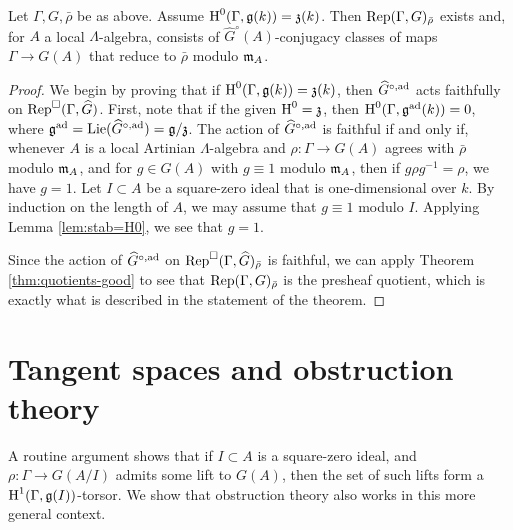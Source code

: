 \begin{theorem}
Let $\Gamma,G,\bar\rho$ be as above. Assume $\operatorname{H}^0(\Gamma,\mathfrak{g}(k))=\mathfrak{z}(k)$. Then 
$\operatorname{Rep}(\Gamma,G)_{\bar\rho}$ exists and, for $A$ a local $\Lambda$-algebra, 
consists of $\widehat G^\circ(A)$-conjugacy classes of maps 
$\Gamma \to  G(A)$ that reduce to $\bar\rho$ modulo $\mathfrak{m}_A$. 
\end{theorem}
\begin{proof}
We begin by proving that if $\operatorname{H}^0(\Gamma,\mathfrak{g}(k)) = \mathfrak{z}(k)$, then 
$\widehat G^{\circ,\mathrm{ad}}$ acts faithfully on $\operatorname{Rep}^\square(\Gamma,\widehat G)$. 
First, note that if the given $\operatorname{H}^0 = \mathfrak{z}$, then 
$\operatorname{H}^0(\Gamma,\mathfrak{g}^{\mathrm{ad}}(k)) = 0$, where 
$\mathfrak{g}^{\mathrm{ad}} = \operatorname{Lie}(\widehat G^{\circ,\mathrm{ad}}) = \mathfrak{g} / \mathfrak{z}$. The action of 
$\widehat G^{\circ,\mathrm{ad}}$ is faithful if and only if, whenever $A$ is a local 
Artinian $\Lambda$-algebra and $\rho\colon \Gamma \to G(A)$ agrees with 
$\bar\rho$ modulo $\mathfrak{m}_A$, and for $g\in G(A)$ with $g\equiv 1$ modulo 
$\mathfrak{m}_A$, then if $g \rho g^{-1} = \rho$, we have $g = 1$. 
Let $I\subset A$ be a square-zero ideal that is one-dimensional over $k$. By 
induction on the length of $A$, we may assume that $g \equiv 1$ modulo 
$I$. Applying Lemma \ref{lem:stab=H0}, we see that $g = 1$. 

Since the action of $\widehat G^{\circ,\mathrm{ad}}$ on 
$\operatorname{Rep}^\square(\Gamma,\widehat G)_{\bar\rho}$ is faithful, we can apply 
Theorem \ref{thm:quotients-good} to see that $\operatorname{Rep}(\Gamma,G)_{\bar\rho}$ is 
the presheaf quotient, which is exactly what is described in the statement of 
the theorem. 
\end{proof}





\section{Tangent spaces and obstruction theory}

A routine argument shows that if $I\subset A$ is a square-zero ideal, and 
$\rho\colon \Gamma \to G(A/I)$ admits some lift to $G(A)$, then the set of 
such lifts form a $\operatorname{H}^1(\Gamma,\mathfrak{g}(I))$-torsor. We show that obstruction 
theory also works in this more general context. 

